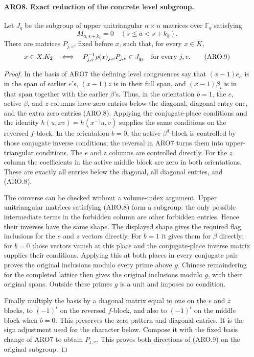 \paragraph{ARO8. Exact reduction of the concrete level subgroup.}
\label{claim:ARO8}
Let \(J_q\) be the subgroup of upper unitriangular
\(n\times n\) matrices over \(\mathbb F_q\) satisfying
\[
                  M_{a,s+k_0}=0\quad(s\leq a<s+k_0).
 \tag{ARO.8}
\]
There are matrices \(P_{j,v}\), fixed before \(x\), such that,
for every \(x\in K\),
\[
 x\in X.K_2\quad\Longleftrightarrow\quad
 P_{j,v}^{-1}\rho(x)_{j,v}P_{j,v}\in J_{q_j}
                    \quad\hbox{for every }j,v.       \tag{ARO.9}
\]
\begin{proof}
In the basis of ARO7 the defining level congruences say that
\((x-1)e_a\) is in the span of earlier \(e\)'s,
\((x-1)z\) is in their full span, and
\((x-1)\beta_i\) is in that span together with the earlier
\(\beta\)'s.  Thus, in the orientation \(b=1\), the \(e\),
active \(\beta\), and \(z\) columns have zero entries below the
diagonal, diagonal entry one, and the extra zero entries (ARO.8).
Applying the conjugate-place conditions and the identity
\(h(u,xv)=h(x^{-1}u,v)\) supplies the same conditions on the
reversed \(f\)-block.  In the orientation \(b=0\), the active
\(\beta^d\)-block is controlled by those conjugate inverse
conditions; the reversal in ARO7 turns them into upper-triangular
conditions.  The \(e\) and \(z\) columns are controlled directly.
For the \(z\) column the coefficients in the active middle block
are zero in both orientations.  These are exactly all entries below
the diagonal, all diagonal entries, and (ARO.8).

The converse can be checked without a volume-index argument.
Upper unitriangular matrices satisfying (ARO.8) form a subgroup:
the only possible intermediate terms in the forbidden column are
other forbidden entries.  Hence their inverses have the same shape.
The displayed shape gives the required flag inclusions for the
\(e\) and \(z\) vectors directly.  For \(b=1\) it gives them for
\(\beta\) directly; for \(b=0\) those vectors vanish at this
place and the conjugate-place inverse matrix supplies their
conditions.  Applying this at both places in every conjugate pair
proves the original inclusions modulo every prime above \(g\).
Chinese remaindering for the completed lattice then gives the
original inclusions modulo \(g\), with their original spans.
Outside these primes \(g\) is a unit and imposes no condition.

Finally multiply the basis by a diagonal matrix equal to one on
the \(e\) and \(z\) blocks, to \((-1)^i\) on the reversed
\(f\)-block, and also to \((-1)^i\) on the middle block when
\(b=0\).  This preserves the zero pattern and diagonal entries.
It is the sign adjustment used for the character below.  Compose
it with the fixed basis change of ARO7 to obtain \(P_{j,v}\).
This proves both directions of (ARO.9) on the original subgroup.
\end{proof}

